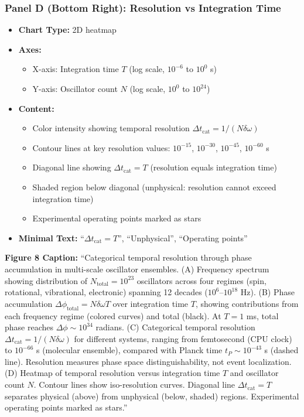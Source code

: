 \subsubsection*{Panel D (Bottom Right): Resolution vs Integration Time}
\begin{itemize}
\item \textbf{Chart Type:} 2D heatmap
\item \textbf{Axes:}
  \begin{itemize}
  \item X-axis: Integration time $T$ (log scale, $10^{-6}$ to $10^0$ s)
  \item Y-axis: Oscillator count $N$ (log scale, $10^0$ to $10^{24}$)
  \end{itemize}
\item \textbf{Content:}
  \begin{itemize}
  \item Color intensity showing temporal resolution $\Delta t_{\text{cat}} = 1/(N\delta\omega)$
  \item Contour lines at key resolution values: $10^{-15}$, $10^{-30}$, $10^{-45}$, $10^{-60}$ s
  \item Diagonal line showing $\Delta t_{\text{cat}} = T$ (resolution equals integration time)
  \item Shaded region below diagonal (unphysical: resolution cannot exceed integration time)
  \item Experimental operating points marked as stars
  \end{itemize}
\item \textbf{Minimal Text:} ``$\Delta t_{\text{cat}} = T$'', ``Unphysical'', ``Operating points''
\end{itemize}

\textbf{Figure 8 Caption:}
``Categorical temporal resolution through phase accumulation in multi-scale oscillator ensembles. (A) Frequency spectrum showing distribution of $N_{\text{total}}=10^{23}$ oscillators across four regimes (spin, rotational, vibrational, electronic) spanning 12 decades ($10^6$--$10^{18}$ Hz). (B) Phase accumulation $\Delta\phi_{\text{total}} = N\delta\omega T$ over integration time $T$, showing contributions from each frequency regime (colored curves) and total (black). At $T=1$ ms, total phase reaches $\Delta\phi \sim 10^{34}$ radians. (C) Categorical temporal resolution $\Delta t_{\text{cat}} = 1/(N\delta\omega)$ for different systems, ranging from femtosecond (CPU clock) to $10^{-66}$ s (molecular ensemble), compared with Planck time $t_P \sim 10^{-43}$ s (dashed line). Resolution measures phase space distinguishability, not event localization. (D) Heatmap of temporal resolution versus integration time $T$ and oscillator count $N$. Contour lines show iso-resolution curves. Diagonal line $\Delta t_{\text{cat}}=T$ separates physical (above) from unphysical (below, shaded) regions. Experimental operating points marked as stars.''

